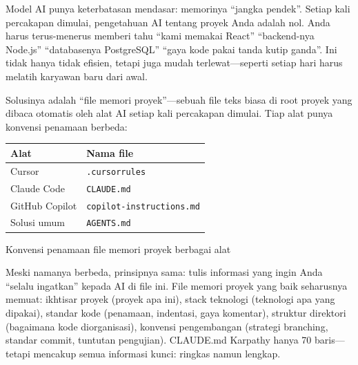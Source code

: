 


Model AI punya keterbatasan mendasar: memorinya “jangka pendek”. Setiap kali percakapan dimulai, pengetahuan AI tentang proyek Anda adalah nol. Anda harus terus-menerus memberi tahu “kami memakai React” “backend-nya Node.js” “databasenya PostgreSQL” “gaya kode pakai tanda kutip ganda”. Ini tidak hanya tidak efisien, tetapi juga mudah terlewat—seperti setiap hari harus melatih karyawan baru dari awal.

Solusinya adalah “file memori proyek”—sebuah file teks biasa di root proyek yang dibaca otomatis oleh alat AI setiap kali percakapan dimulai. Tiap alat punya konvensi penamaan berbeda:

\begin{center}
\begin{tabularx}{\linewidth}{|X|X|}
\hline
\textbf{Alat} & \textbf{Nama file} \tabularnewline
\hline
Cursor & \texttt{.\allowbreak cursorrules} \tabularnewline
Claude Code & \texttt{CLAUDE.\allowbreak md} \tabularnewline
GitHub Copilot & \texttt{copilot-\allowbreak instructions.\allowbreak md} \tabularnewline
Solusi umum & \texttt{AGENTS.\allowbreak md} \tabularnewline
\hline
\end{tabularx}
\end{center}

\begin{center}\small\color{gray}Konvensi penamaan file memori proyek berbagai alat\end{center}

Meski namanya berbeda, prinsipnya sama: tulis informasi yang ingin Anda “selalu ingatkan” kepada AI di file ini. File memori proyek yang baik seharusnya memuat: ikhtisar proyek (proyek apa ini), stack teknologi (teknologi apa yang dipakai), standar kode (penamaan, indentasi, gaya komentar), struktur direktori (bagaimana kode diorganisasi), konvensi pengembangan (strategi branching, standar commit, tuntutan pengujian). CLAUDE.md Karpathy hanya 70 baris—tetapi mencakup semua informasi kunci: ringkas namun lengkap.

